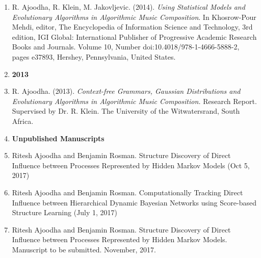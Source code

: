 \documentclass[]{friggeri-cv} %
\begin{document}
\begin{enumerate}
\item[]	R. Ajoodha, R. Klein, M. Jakovljevic. (2014). {\it Using Statistical Models and Evolutionary Algorithms in Algorithmic Music Composition}. In Khosrow-Pour Mehdi,	editor, The Encyclopedia of Information Science and Technology, 3rd edition, IGI Global: International Publisher of Progressive Academic Research Books and Journals. Volume 10, Number doi:10.4018/978-1-4666-5888-2, pages e37893, Hershey, Pennsylvania, United States.
	
\item[] {\large \bf 2013}
	
\item[] R. Ajoodha. (2013). {\it Context-free Grammars, Gaussian Distributions and Evolutionary Algorithms in Algorithmic Music Composition.} Research Report. Supervised by Dr. R. Klein. The University of the Witwatersrand, South Africa.

\item[] {\large \bf Unpublished Manuscripts}

\item[] Ritesh Ajoodha and Benjamin Rosman. Structure Discovery of Direct Influence between Processes Represented by Hidden Markov Models (Oct 5, 2017)

\item[] Ritesh Ajoodha and Benjamin Rosman. Computationally Tracking Direct Influence between Hierarchical Dynamic Bayesian Networks using Score-based Structure Learning (July 1, 2017)

\item[] Ritesh Ajoodha and Benjamin Rosman. Structure Discovery of Direct Influence between Processes Represented by Hidden Markov Models. Manuscript to be submitted. November, 2017.

\end{enumerate}

\end{document}

